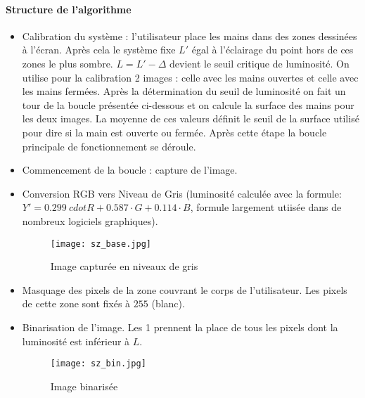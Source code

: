 \paragraph{Structure de l'algorithme}
\begin{itemize}
    \item  Calibration du système : l'utilisateur place les mains dans des zones dessinées à l'écran. Après cela le système fixe $L'$ égal à l'éclairage du point hors de ces zones le plus sombre. $L=L'-\Delta$ devient le seuil critique de luminosité. On utilise pour la calibration 2 images : celle avec les mains ouvertes et celle avec les mains fermées. Après la détermination du seuil de luminosité on fait un tour de la boucle présentée ci-dessous et on calcule la surface des mains pour les deux images. La moyenne de ces valeurs définit le seuil de la surface utilisé pour dire si la main est ouverte ou fermée. Après cette étape la boucle principale de fonctionnement se déroule.
    \item Commencement de la boucle : capture de l'image.
    \item Conversion RGB vers Niveau de Gris (luminosité calculée avec la formule: $Y'=0.299 \ cdot R + 0.587 \cdot G +  0.114 \cdot B$, formule largement utiisée dans de nombreux logiciels graphiques). 
    
		\begin{figure}[h!]
    		\centering
    		\texttt{[image: sz\_base.jpg]}
    		\caption{Image capturée en niveaux de gris}
		\end{figure}

    \item Masquage des pixels de la zone couvrant le corps de l'utilisateur. Les pixels de cette zone sont fixés à $255$ (blanc).
    
    \item Binarisation de l'image. Les 1 prennent la place de tous les pixels dont la luminosité est inférieur à $L$.
    
		\begin{figure}[h!]
    		\centering
    		\texttt{[image: sz\_bin.jpg]}
    		\caption{Image binarisée}
		\end{figure}
    

\end{itemize}
